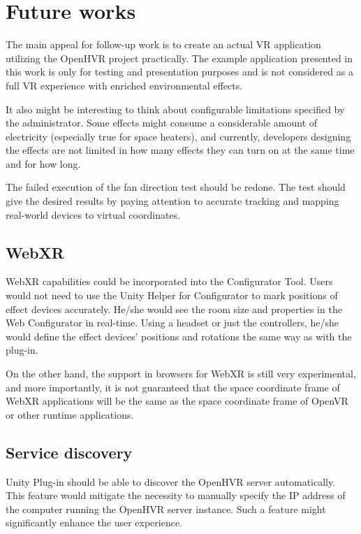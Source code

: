 \chapter{Future works}
The main appeal for follow-up work is to create an actual VR application
utilizing the OpenHVR project practically. The example application presented 
in this work is only for testing and presentation purposes and is not considered
as a full VR experience with enriched environmental effects.

It also might be interesting to think about configurable limitations specified
by the administrator.
Some effects might consume a considerable amount of electricity (especially
true for space heaters), and currently, developers designing the effects are
not limited in how many effects they can turn on at the same time and for how
long.

The failed execution of the fan direction test should be redone. The test
should give the desired results by paying attention to accurate tracking and
mapping real-world devices to virtual coordinates.

\section{WebXR}

WebXR capabilities could be incorporated into the Configurator Tool.
Users would not need to use the Unity Helper for Configurator to mark positions
of effect devices accurately. He/she would see the room
size and properties in the Web Configurator in real-time. Using a headset or
just the controllers, he/she would define the effect devices' positions and
rotations the same way as with the plug-in. 

On the other hand, the support in browsers for WebXR is still very experimental,
and more importantly, it is not guaranteed that the space coordinate frame
of WebXR applications will be the same as the space coordinate frame of OpenVR
or other runtime applications.

\section{Service discovery}

Unity Plug-in should be able to discover the OpenHVR server automatically. 
This feature would mitigate the necessity to manually specify the IP address
of the computer running the OpenHVR server instance. Such a feature might
significantly enhance the user experience.
